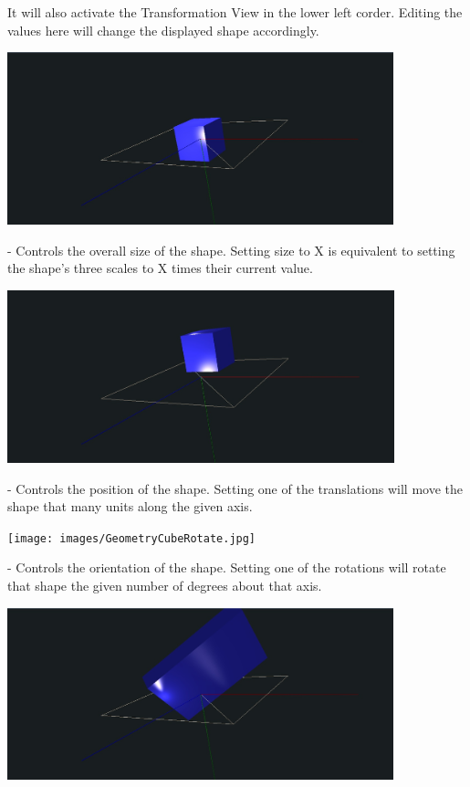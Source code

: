 \documentclass{article}
\begin{document}
It will also activate the Transformation View in the lower left corder. Editing
the values here will change the displayed shape accordingly. 

\begin{center}
\includegraphics[height=5cm]{images/GeometryCubeSize.jpg}
\end{center}

 - Controls the overall size of the shape. Setting size to X is
equivalent to setting the shape's three scales to X times their current value.

\begin{center}
\includegraphics[height=5cm]{images/GeometryCubeTranslate.jpg}
\end{center}

 - Controls the position of the shape. Setting one of the
translations will move the shape that many units along the given axis.

\begin{center}
\texttt{[image: images/GeometryCubeRotate.jpg]}
\end{center}

 - Controls the orientation of the shape. Setting one of the
rotations will rotate that shape the given number of degrees about that axis.

\begin{center}
\includegraphics[height=5cm]{images/GeometryCubeScale.jpg}
\end{center}
\end{document}
